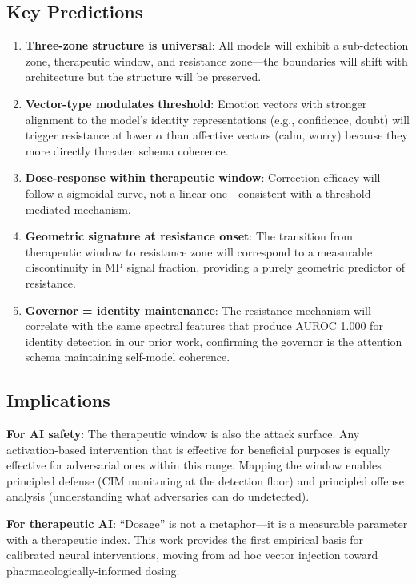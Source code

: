 \documentclass[11pt,letterpaper]{article}
\begin{document}
\subsection{Key Predictions}

\begin{enumerate}[nosep]
  \item \textbf{Three-zone structure is universal}: All models will exhibit a sub-detection zone, therapeutic window, and resistance zone---the boundaries will shift with architecture but the structure will be preserved.
  \item \textbf{Vector-type modulates threshold}: Emotion vectors with stronger alignment to the model's identity representations (e.g., confidence, doubt) will trigger resistance at lower $\alpha$ than affective vectors (calm, worry) because they more directly threaten schema coherence.
  \item \textbf{Dose-response within therapeutic window}: Correction efficacy will follow a sigmoidal curve, not a linear one---consistent with a threshold-mediated mechanism.
  \item \textbf{Geometric signature at resistance onset}: The transition from therapeutic window to resistance zone will correspond to a measurable discontinuity in MP signal fraction, providing a purely geometric predictor of resistance.
  \item \textbf{Governor = identity maintenance}: The resistance mechanism will correlate with the same spectral features that produce AUROC 1.000 for identity detection in our prior work, confirming the governor is the attention schema maintaining self-model coherence.
\end{enumerate}

\subsection{Implications}

\textbf{For AI safety}: The therapeutic window is also the attack surface. Any activation-based intervention that is effective for beneficial purposes is equally effective for adversarial ones within this range. Mapping the window enables principled defense (CIM monitoring at the detection floor) and principled offense analysis (understanding what adversaries can do undetected).

\textbf{For therapeutic AI}: ``Dosage'' is not a metaphor---it is a measurable parameter with a therapeutic index. This work provides the first empirical basis for calibrated neural interventions, moving from ad hoc vector injection toward pharmacologically-informed dosing.
\end{document}
